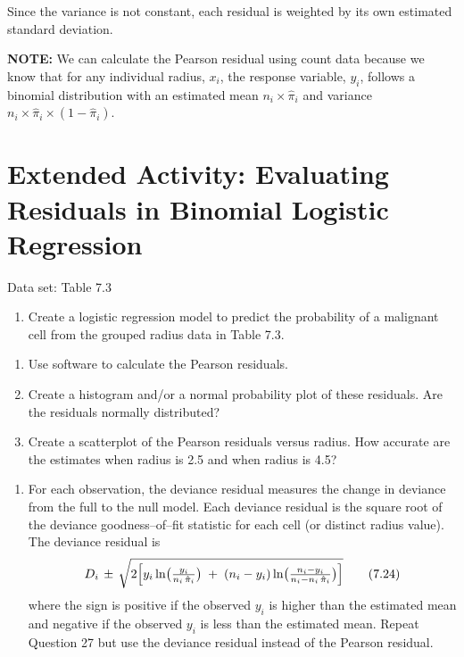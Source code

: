 \documentclass[
]{report}
\providecommand{\tightlist}{%
  \setlength{\itemsep}{0pt}\setlength{\parskip}{0pt}}
\begin{document}
Since the variance is not constant, each residual is weighted by its own estimated standard deviation.

\large

\textbf{NOTE:}
We can calculate the Pearson residual using count data because we know that for any individual radius, \(x_i\), the response variable, \(y_i\), follows a binomial distribution with an estimated mean \(n_i \times \hat\pi_i\) and variance \(n_i \times \hat\pi_i \times (1 - \hat\pi_i)\).\\
\normalsize

\section*{Extended Activity: Evaluating Residuals in Binomial Logistic Regression}\label{extended-activity-evaluating-residuals-in-binomial-logistic-regression}

Data set: Table 7.3

\begin{enumerate}
\def\labelenumi{\arabic{enumi}.}
\setcounter{enumi}{26}
\tightlist
\item
  Create a logistic regression model to predict the probability of a malignant cell from the grouped radius data in Table 7.3.\\
\end{enumerate}

\begin{enumerate}
\def\labelenumi{\alph{enumi}.}
\tightlist
\item
  Use software to calculate the Pearson residuals.\\
\item
  Create a histogram and/or a normal probability plot of these residuals. Are the residuals normally distributed?\\
\item
  Create a scatterplot of the Pearson residuals versus radius. How accurate are the estimates when radius is 2.5 and when radius is 4.5?
\end{enumerate}

\begin{enumerate}
\def\labelenumi{\arabic{enumi}.}
\setcounter{enumi}{27}
\tightlist
\item
  For each observation, the deviance residual measures the change in deviance from the full to the null model. Each deviance residual is the square root of the deviance goodness--of--fit statistic for each cell (or distinct radius value). The deviance residual is
  \begin{align}
  D_i \,\pm\, \sqrt{2 \Bigl[
  y_i \ln\bigl(\tfrac{y_i}{n_i\,\hat\pi_i}\bigr)
  \;+\;(n_i - y_i)\ln\bigl(\tfrac{n_i - y_i}{n_i - n_i\,\hat\pi_i}\bigr)
  \Bigr]}
  \tag{7.24}
  \end{align}
  where the sign is positive if the observed \(y_i\) is higher than the estimated mean and negative if the
  observed \(y_i\) is less than the estimated mean. Repeat Question 27 but use the deviance residual instead
  of the Pearson residual.
\end{enumerate}
\end{document}
